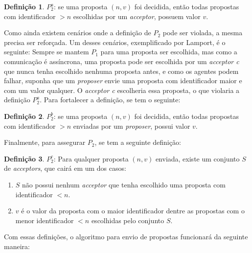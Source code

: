 \documentclass[
    12pt,
    openright, 
    oneside,
    a4paper,
    french,
    english,
    brazil
    ]{facom-ufu-abntex2}
\theoremstyle{definition}
\newtheorem{definition}{Definição}
\begin{document}
\begin{definition}
$P_2^a$: se uma proposta $(n, v)$ foi decidida, então todas propostas com identificador
$>n$ escolhidas por um \emph{acceptor}, possuem valor $v$.
\end{definition}

Como ainda existem cenários onde a definição de $P_2$ pode ser violada, a mesma precisa ser
reforçada. Um desses cenários, exemplificado por Lamport, é o seguinte:
Sempre se mantem $P_1$ para uma proposta ser escolhida, mas como
a comunicação é assíncrona, uma proposta pode ser escolhida por um \emph{acceptor c} 
que nunca tenha escolhido nenhuma proposta antes, e como os agentes podem falhar, suponha
que um \emph{proposer} envie uma proposta com identificador maior e com um valor qualquer.
O \emph{acceptor c} escolheria essa proposta, o que violaria a definição $P_2^a$. Para
fortalecer a definição, se tem o seguinte:

\begin{definition}
$P_2^b$: se uma proposta $(n, v)$ foi decidida, então todas propostas com identificador
$>n$ enviadas por um \emph{proposer}, possui valor $v$.
\end{definition}

Finalmente, para assegurar $P_2$, se tem a seguinte definição:

\begin{definition}
$P_2^c$: Para qualquer proposta $(n, v)$ enviada, existe um conjunto $S$ de
\emph{acceptors}, que cairá em um dos casos:

\begin{enumerate}
    \item $S$ não possui nenhum \emph{acceptor} que tenha escolhido uma proposta com 
identificador $<n$.

    \item $v$ é o valor da proposta com o maior identificador dentre as propostas com o 
menor identificador $<n$ escolhidas pelo conjunto $S$.
\end{enumerate}
\end{definition}

Com essas definições, o algoritmo para envio de propostas funcionará da seguinte maneira:
\end{document}
